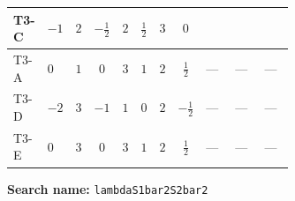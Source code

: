 \documentclass[8pt]{article}
\begin{document}
\begin{landscape}
\begin{longtable}{@{}llcccccc >{\raggedright\arraybackslash}p{0.21\linewidth} >{\raggedright\arraybackslash}p{0.21\linewidth} >{\raggedright\arraybackslash}p{0.21\linewidth}@{}}
\midrule
T3-C & $-1$ & $2$ & $-\frac{1}{2}$ & $2$ & $\frac{1}{2}$ & $3$ & $0$ & \scriptsize\adjustbox{max width=\linewidth}{$\begin{gathered} +8 {\lambda_{12}} {\lambda_{S_1^{\dagger 2}S_2^{\dagger 2}}}\end{gathered}$} & \scriptsize\adjustbox{max width=\linewidth}{$\begin{gathered} +\frac{4 {\lambda_{12}^{\rm Adj}} {\lambda_{S_1^{\dagger 2}S_2^{\dagger 2}}}}{3}\end{gathered}$} & \scriptsize\adjustbox{max width=\linewidth}{$\begin{gathered} +{\lambda_{H H^\dagger S_1^\dagger S_2^\dagger}^{\rm Cross}}^2\end{gathered}$} \\
\midrule
T3-A & $0$ & $1$ & $0$ & $3$ & $1$ & $2$ & $\frac{1}{2}$ & --- & --- & --- \\
\midrule
T3-D & $-2$ & $3$ & $-1$ & $1$ & $0$ & $2$ & $-\frac{1}{2}$ & --- & --- & --- \\
\midrule
T3-E & $0$ & $3$ & $0$ & $3$ & $1$ & $2$ & $\frac{1}{2}$ & --- & --- & --- \\
\midrule
\bottomrule
\end{longtable}
\clearpage
\noindent\textbf{Search name: }\texttt{lambdaS1bar2S2bar2}\par\smallskip

\end{landscape}
\end{document}
